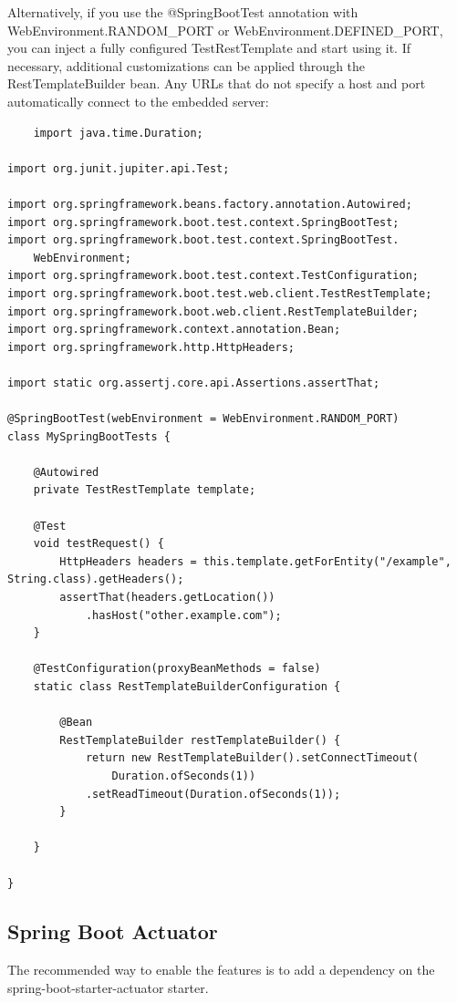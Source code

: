\documentclass{scrartcl}
\begin{document}
Alternatively, if you use the @SpringBootTest annotation with WebEnvironment.RANDOM\_PORT or WebEnvironment.DEFINED\_PORT, you can inject a fully configured TestRestTemplate and start using it. If necessary, additional customizations can be applied through the RestTemplateBuilder bean. Any URLs that do not specify a host and port automatically connect to the embedded server:

\begin{lstlisting}
    import java.time.Duration;

import org.junit.jupiter.api.Test;

import org.springframework.beans.factory.annotation.Autowired;
import org.springframework.boot.test.context.SpringBootTest;
import org.springframework.boot.test.context.SpringBootTest.
    WebEnvironment;
import org.springframework.boot.test.context.TestConfiguration;
import org.springframework.boot.test.web.client.TestRestTemplate;
import org.springframework.boot.web.client.RestTemplateBuilder;
import org.springframework.context.annotation.Bean;
import org.springframework.http.HttpHeaders;

import static org.assertj.core.api.Assertions.assertThat;

@SpringBootTest(webEnvironment = WebEnvironment.RANDOM_PORT)
class MySpringBootTests {

    @Autowired
    private TestRestTemplate template;

    @Test
    void testRequest() {
        HttpHeaders headers = this.template.getForEntity("/example", String.class).getHeaders();
        assertThat(headers.getLocation())
            .hasHost("other.example.com");
    }

    @TestConfiguration(proxyBeanMethods = false)
    static class RestTemplateBuilderConfiguration {

        @Bean
        RestTemplateBuilder restTemplateBuilder() {
            return new RestTemplateBuilder().setConnectTimeout(
                Duration.ofSeconds(1))
            .setReadTimeout(Duration.ofSeconds(1));
        }

    }

}
\end{lstlisting}


\subsection{Spring Boot Actuator}

The recommended way to enable the features is to add a dependency on the spring-boot-starter-actuator starter.
\end{document}
